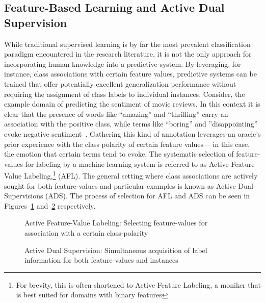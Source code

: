 
\subsection{Feature-Based Learning and Active Dual Supervision}
\label{sec:feat}




While traditional supervised learning is by far the most prevalent classification paradigm encountered in the research literature, it is not the only approach for incorporating human knowledge into a predictive system. By leveraging, for instance, class associations with certain feature values, predictive systems can be trained that offer potentially excellent generalization performance without requiring the assignment of class labels to individual instances. Consider, the example domain of predicting the sentiment of movie reviews. In this context it is clear that the presence of words like ``amazing'' and ``thrilling'' carry an association with the positive class, while terms like ``boring'' and ''disappointing'' evoke negative sentiment~\cite{attenberg:ecml10}. Gathering this kind of annotation leverages an oracle's prior experience with the class polarity of certain feature values--- in this case, the emotion that certain terms tend to evoke. The systematic selection of feature-values for labeling by a machine learning system is referred to as Active Feature-Value Labeling,\footnote{For brevity, this is often shortened to Active Feature Labeling, a moniker that is best suited for domains with binary features} (AFL). The general setting where class associations are actively sought for both feature-values and particular examples is known as Active Dual Supervisions (ADS). The process of selection for AFL and ADS can be seen in Figures~\ref{fig:afl} and~\ref{fig:ads} respectively.

\begin{figure}[t!]
\begin{center}
\end{center}
\caption{Active Feature-Value Labeling: Selecting feature-values for association with a certain class-polarity }
\label{fig:afl}
\end{figure}

\begin{figure}[t!]
\begin{center}
\end{center}
\caption{Active Dual Supervision: Simultaneous acquisition of label information for both feature-values and instances}
\label{fig:ads}
\end{figure}


